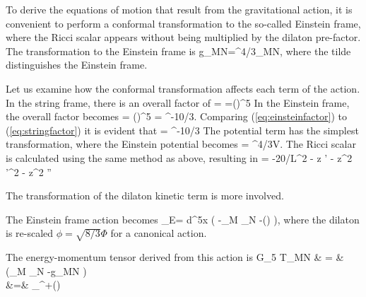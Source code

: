 To derive the equations of motion that result from the gravitational action, it is convenient to perform a conformal transformation to the so-called Einstein frame, where the Ricci scalar appears without being multiplied by the dilaton pre-factor.
The transformation to the Einstein frame is
\be
g_{MN}=\EXP^{4\Phi/3}_{MN},
\label{eq:transform}
\ee
where the tilde distinguishes the Einstein frame. 

Let us examine how the conformal transformation affects each term of the action.
In the string frame, there is an overall factor of 
\be
\root  = =\left(\right)^5
\label{eq:stringfactor}
\ee
In the Einstein frame, the overall factor becomes
\be
{} = \left(\right)^5 =  \EXP^{-10\Phi/3}.
\label{eq:einsteinfactor}
\ee
Comparing (\ref{eq:einsteinfactor}) to (\ref{eq:stringfactor}) it is evident that 
\be
{} = \EXP^{-10\Phi/3}\root
\ee
The potential term has the simplest transformation, where the Einstein potential becomes 
\be
{} = \EXP^{4\Phi/3}V.
\label{eq:Vtrans}
\ee
The Ricci scalar is calculated using the same method as above, resulting in
\be
{} = -20/L^2 - z \phi'  - z^2 \phi'^2 - z^2 \phi''
\ee

The transformation of the dilaton kinetic term is more involved. %

The Einstein frame action becomes 
\be
{}_E= \int d^5x  \left( -\thalf\partial_M \phi \partial_N \phi -(\phi)  \right),
\label{eq:dilatonActionEinstein}
\ee
where the dilaton is re-scaled $\phi=\sqrt{8/3}\Phi$ for a canonical action.

The energy-momentum tensor derived from this action is
\pi G_5 T_{MN} & = & \thalf(\partial_M \phi \partial_N \phi -g_{MN} ) \label{eq:EMtensor1}\\
 &=& \thalf \partial_\lambda \phi \partial^\lambda \phi +(\phi) 
\label{eq:EMtensor2}
\ea

